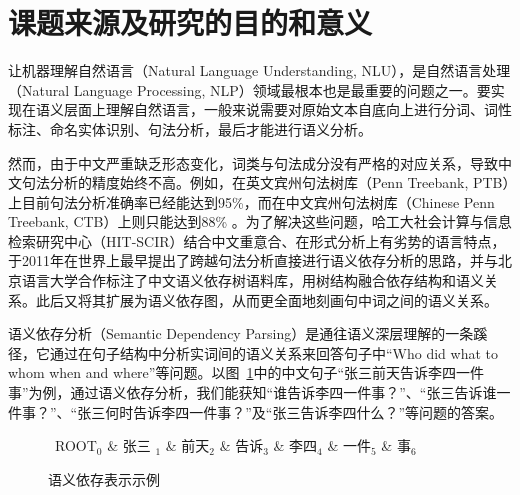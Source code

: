 \section{课题来源及研究的目的和意义}

让机器理解自然语言（Natural Language Understanding, NLU），是自然语言处理（Natural Language Processing, NLP）领域最根本也是最重要的问题之一。要实现在语义层面上理解自然语言，一般来说需要对原始文本自底向上进行分词、词性标注、命名实体识别、句法分析，最后才能进行语义分析。

然而，由于中文严重缺乏形态变化，词类与句法成分没有严格的对应关系，导致中文句法分析的精度始终不高。例如，在英文宾州句法树库（Penn Treebank, PTB）上目前句法分析准确率已经能达到95\%，而在中文宾州句法树库（Chinese Penn Treebank, CTB）上则只能达到88\% \cite{dozat2017deep}。为了解决这些问题，哈工大社会计算与信息检索研究中心（HIT-SCIR）结合中文重意合、在形式分析上有劣势的语言特点，于2011年在世界上最早提出了跨越句法分析直接进行语义依存分析的思路，并与北京语言大学合作标注了中文语义依存树语料库，用树结构融合依存结构和语义关系。此后又将其扩展为语义依存图，从而更全面地刻画句中词之间的语义关系。

语义依存分析（Semantic Dependency Parsing）是通往语义深层理解的一条蹊径，它通过在句子结构中分析实词间的语义关系来回答句子中“Who did what to whom when and where”等问题。以图~\ref{fig:sdp0}中的中文句子“张三前天告诉李四一件事”为例，通过语义依存分析，我们能获知“谁告诉李四一件事？”、“张三告诉谁一件事？”、“张三何时告诉李四一件事？”及“张三告诉李四什么？”等问题的答案。

\begin{figure}[tb]
	\begin{center}
		\begin{small}
			\begin{dependency}[arc edge, arc angle=80, text only label, label style={above}]
				\begin{deptext} [row sep=0.4cm, column sep=.1cm]
					\ ROOT$_0$ \& 张三 $_1$ \& 前天$_2$ \& 告诉$_3$ \&  李四$_4$  \& 一件$_5$ \& 事$_6$ \\
				\end{deptext}
			\end{dependency}
			\caption{语义依存表示示例}\label{fig:sdp0}
		\end{small}
	\end{center}
\end{figure}


